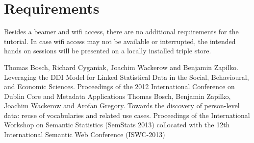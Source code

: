 \documentclass{llncs}
\begin{document}


\section{Requirements}

Besides a beamer and wifi access, there are no additional requirements for the tutorial. In case wifi access may not be available or interrupted, the intended hands on sessions will be presented on a locally installed triple store.

%
\begin{thebibliography}{1}
Thomas Bosch, Richard Cyganiak, Joachim Wackerow and Benjamin Zapilko. Leveraging the {DDI} Model for Linked Statistical Data in the Social, Behavioural, and Economic Sciences. Proceedings of the 2012 International Conference on Dublin Core and 	Metadata Applications
Thomas Bosch, Benjamin Zapilko, Joachim Wackerow and Arofan Gregory. Towards the discovery of person-level data: reuse of vocabularies and related use cases. Proceedings of the International Workshop on Semantic Statistics (SemStats 2013) collocated with the 12th International Semantic Web Conference (ISWC-2013)
\end{thebibliography}
\end{document}
